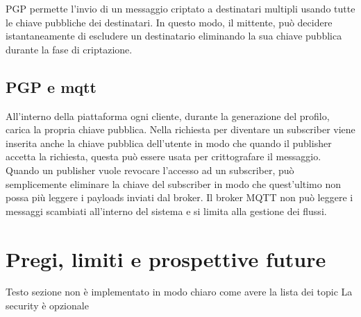 PGP permette l'invio di un messaggio criptato a destinatari multipli usando tutte le chiave pubbliche dei destinatari. In questo modo, il mittente, può decidere istantaneamente di escludere un destinatario eliminando la sua chiave pubblica durante la fase di criptazione. 
\subsection{PGP e mqtt}
All'interno della piattaforma ogni cliente, durante la generazione del profilo, carica la propria chiave pubblica.
Nella richiesta per diventare un subscriber viene inserita anche la chiave pubblica dell'utente in modo che quando il publisher accetta la richiesta, questa può essere usata per crittografare il messaggio.
Quando un publisher vuole revocare l'accesso ad un subscriber, può semplicemente eliminare la chiave del subscriber in modo che quest'ultimo non possa più leggere i payloads inviati dal broker.
Il broker MQTT non può leggere i messaggi scambiati all'interno del sistema e si limita alla gestione dei flussi.


\section{Pregi, limiti e prospettive future}
Testo sezione
non è implementato in modo chiaro come avere la lista dei topic
La security è opzionale

